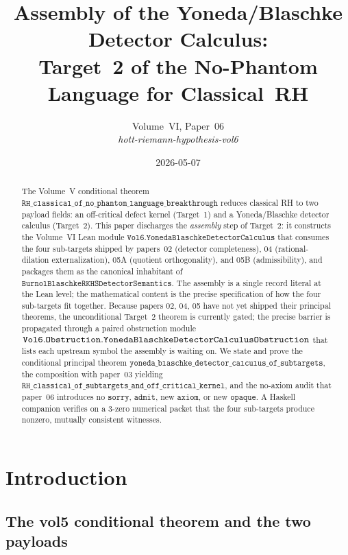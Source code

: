 \documentclass[12pt]{article}
\title{Assembly of the Yoneda/Blaschke Detector Calculus:\\
Target~2 of the No-Phantom Language for Classical~RH}
\author{Volume~VI, Paper~06\\\textit{hott-riemann-hypothesis-vol6}}
\date{2026-05-07}
\theoremstyle{plain}
\theoremstyle{definition}
\theoremstyle{remark}
\begin{document}
\maketitle

\begin{abstract}
The Volume~V conditional theorem
\(\mathtt{RH\_classical\_of\_no\_phantom\_language\_breakthrough}\) reduces
classical RH to two payload fields: an off-critical defect kernel
(Target~1) and a Yoneda/Blaschke detector calculus (Target~2). This paper
discharges the \emph{assembly} step of Target~2: it constructs the
Volume~VI Lean module \(\mathtt{Vol6.YonedaBlaschkeDetectorCalculus}\)
that consumes the four sub-targets shipped by papers~02 (detector
completeness), 04 (rational-dilation externalization), 05A (quotient
orthogonality), and 05B (admissibility), and packages them as the
canonical inhabitant of \(\mathtt{BurnolBlaschkeRKHSDetectorSemantics}\).
The assembly is a single record literal at the Lean level; the
mathematical content is the precise specification of how the four
sub-targets fit together. Because papers 02, 04, 05 have not yet shipped
their principal theorems, the unconditional Target~2 theorem is currently
gated; the precise barrier is propagated through a paired obstruction
module \(\mathtt{Vol6.Obstruction.Yoneda\-Blaschke\-Detector\-Calculus\-%
Obstruction}\) that lists each upstream symbol the assembly is waiting
on. We state and prove the conditional principal theorem
\(\mathtt{yoneda\_blaschke\_detector\_calculus\_of\_subtargets}\), the
composition with paper~03 yielding
\(\mathtt{RH\_classical\_of\_subtargets\_and\_off\_critical\_kernel}\),
and the no-axiom audit that paper~06 introduces no \(\mathtt{sorry}\),
\(\mathtt{admit}\), new \(\mathtt{axiom}\), or new \(\mathtt{opaque}\).
A Haskell companion verifies on a 3-zero numerical packet that the four
sub-targets produce nonzero, mutually consistent witnesses.
\end{abstract}

\tableofcontents

\newpage

\section{Introduction}
\label{sec:introduction}

\subsection{The vol5 conditional theorem and the two payloads}
\end{document}

